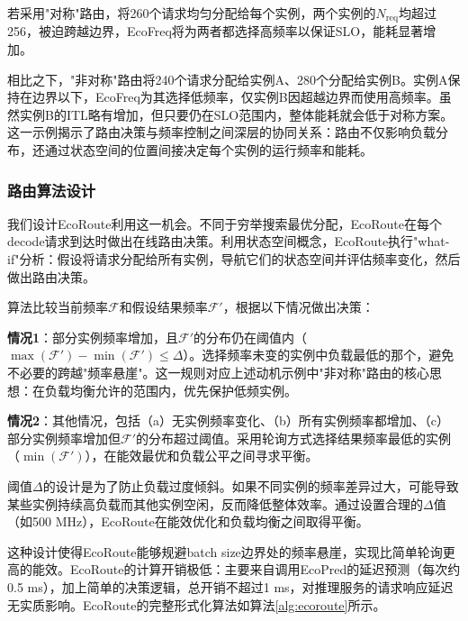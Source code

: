 若采用"对称"路由，将260个请求均匀分配给每个实例，两个实例的$N_{\text{req}}$均超过256，被迫跨越边界，EcoFreq将为两者都选择高频率以保证SLO，能耗显著增加。

相比之下，"非对称"路由将240个请求分配给实例A、280个分配给实例B。实例A保持在边界以下，EcoFreq为其选择低频率，仅实例B因超越边界而使用高频率。虽然实例B的ITL略有增加，但只要仍在SLO范围内，整体能耗就会低于对称方案。这一示例揭示了路由决策与频率控制之间深层的协同关系：路由不仅影响负载分布，还通过状态空间的位置间接决定每个实例的运行频率和能耗。

\subsubsection{路由算法设计}

我们设计EcoRoute利用这一机会。不同于穷举搜索最优分配，EcoRoute在每个decode请求到达时做出在线路由决策。利用状态空间概念，EcoRoute执行"what-if"分析：假设将请求分配给所有实例，导航它们的状态空间并评估频率变化，然后做出路由决策。

算法比较当前频率$\mathcal{F}$和假设结果频率$\mathcal{F}'$，根据以下情况做出决策：

\textbf{情况1}：部分实例频率增加，且$\mathcal{F}'$的分布仍在阈值内（$\max(\mathcal{F}')-\min(\mathcal{F}') \le \Delta$）。选择频率未变的实例中负载最低的那个，避免不必要的跨越"频率悬崖"。这一规则对应上述动机示例中"非对称"路由的核心思想：在负载均衡允许的范围内，优先保护低频实例。

\textbf{情况2}：其他情况，包括（a）无实例频率变化、（b）所有实例频率都增加、（c）部分实例频率增加但$\mathcal{F}'$的分布超过阈值。采用轮询方式选择结果频率最低的实例（$\min(\mathcal{F}')$），在能效最优和负载公平之间寻求平衡。

阈值$\Delta$的设计是为了防止负载过度倾斜。如果不同实例的频率差异过大，可能导致某些实例持续高负载而其他实例空闲，反而降低整体效率。通过设置合理的$\Delta$值（如500 MHz），EcoRoute在能效优化和负载均衡之间取得平衡。

这种设计使得EcoRoute能够规避batch size边界处的频率悬崖，实现比简单轮询更高的能效。EcoRoute的计算开销极低：主要来自调用EcoPred的延迟预测（每次约0.5 ms），加上简单的决策逻辑，总开销不超过1 ms，对推理服务的请求响应延迟无实质影响。EcoRoute的完整形式化算法如算法\ref{alg:ecoroute}所示。

